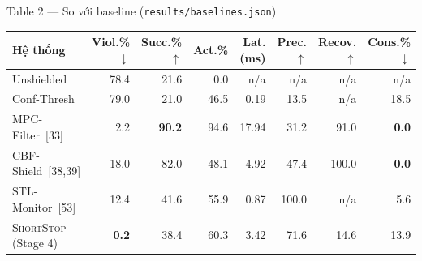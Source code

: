 \documentclass[aspectratio=169]{beamer}
\newcommand{\st}{\textsc{ShortStop}}
\begin{document}
\begin{frame}[t,shrink=8]{Table 2 --- So với baseline (\texttt{results/baselines.json})}
\scriptsize
\begin{center}
\begin{tabular}{@{}l r r r r r r r@{}}
\toprule
\textbf{Hệ thống} & \textbf{Viol.\%$\downarrow$} & \textbf{Succ.\%$\uparrow$} & \textbf{Act.\%} & \textbf{Lat.(ms)} & \textbf{Prec.$\uparrow$} & \textbf{Recov.$\uparrow$} & \textbf{Cons.\%$\downarrow$} \\
\midrule
Unshielded & 78.4 & 21.6 & 0.0 & n/a & n/a & n/a & n/a \\
Conf-Thresh & 79.0 & 21.0 & 46.5 & 0.19 & 13.5 & n/a & 18.5 \\
MPC-Filter~[33] & 2.2 & \textbf{90.2} & 94.6 & 17.94 & 31.2 & 91.0 & \textbf{0.0} \\
CBF-Shield~[38,39] & 18.0 & 82.0 & 48.1 & 4.92 & 47.4 & 100.0 & \textbf{0.0} \\
STL-Monitor~[53] & 12.4 & 41.6 & 55.9 & 0.87 & 100.0 & n/a & 5.6 \\
\st{} (Stage 4) & \textbf{0.2} & 38.4 & 60.3 & 3.42 & 71.6 & 14.6 & 13.9 \\
\bottomrule
\end{tabular}
\end{center}
\end{frame}
\end{document}
